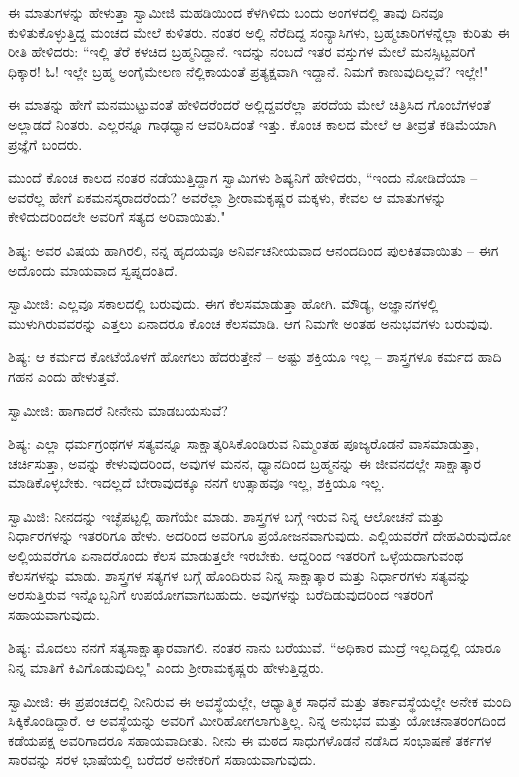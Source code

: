 ಈ ಮಾತುಗಳನ್ನು ಹೇಳುತ್ತಾ ಸ್ವಾಮೀಜಿ ಮಹಡಿಯಿಂದ ಕೆಳಗಿಳಿದು ಬಂದು ಅಂಗಳದಲ್ಲಿ ತಾವು ದಿನವೂ ಕುಳಿತುಕೊಳ್ಳುತ್ತಿದ್ದ ಮಂಚದ ಮೇಲೆ ಕುಳಿತರು. ನಂತರ ಅಲ್ಲಿ ನೆರೆದಿದ್ದ ಸಂನ್ಯಾಸಿಗಳು, ಬ್ರಹ್ಮಚಾರಿಗಳನ್ನೆಲ್ಲಾ ಕುರಿತು ಈ ರೀತಿ ಹೇಳಿದರು: “ಇಲ್ಲಿ ತೆರೆ ಕಳಚಿದ ಬ್ರಹ್ಮನಿದ್ದಾನೆ. ಇದನ್ನು ನಂಬದೆ ಇತರ ವಸ್ತುಗಳ ಮೇಲೆ ಮನಸ್ಸಿಟ್ಟವರಿಗೆ ಧಿಕ್ಕಾರ! ಓ! ಇಲ್ಲೇ ಬ್ರಹ್ಮ ಅಂಗೈಮೇಲಣ ನೆಲ್ಲಿಕಾಯಂತೆ ಪ್ರತ್ಯಕ್ಷವಾಗಿ ಇದ್ದಾನೆ. ನಿಮಗೆ ಕಾಣುವುದಿಲ್ಲವೆ? ಇಲ್ಲೇ!"

ಈ ಮಾತನ್ನು ಹೇಗೆ ಮನಮುಟ್ಟುವಂತೆ ಹೇಳಿದರೆಂದರೆ ಅಲ್ಲಿದ್ದವರೆಲ್ಲಾ ಪರದೆಯ ಮೇಲೆ ಚಿತ್ರಿಸಿದ ಗೊಂಬೆಗಳಂತೆ ಅಲ್ಲಾಡದೆ ನಿಂತರು. ಎಲ್ಲರನ್ನೂ ಗಾಢಧ್ಯಾನ ಆವರಿಸಿದಂತೆ ಇತ್ತು. ಕೊಂಚ ಕಾಲದ ಮೇಲೆ ಆ ತೀವ್ರತೆ ಕಡಿಮೆಯಾಗಿ ಪ್ರಜ್ಞೆಗೆ ಬಂದರು.

ಮುಂದೆ ಕೊಂಚ ಕಾಲದ ನಂತರ ನಡೆಯುತ್ತಿದ್ದಾಗ ಸ್ವಾಮಿಗಳು ಶಿಷ್ಯನಿಗೆ ಹೇಳಿದರು, “ಇಂದು ನೋಡಿದೆಯಾ – ಅವರೆಲ್ಲ ಹೇಗೆ ಏಕಮನಸ್ಕರಾದರೆಂದು? ಅವರೆಲ್ಲಾ ಶ‍್ರೀರಾಮಕೃಷ್ಣರ ಮಕ್ಕಳು, ಕೇವಲ ಆ ಮಾತುಗಳನ್ನು ಕೇಳಿದುದರಿಂದಲೇ ಅವರಿಗೆ ಸತ್ಯದ ಅರಿವಾಯಿತು."

ಶಿಷ್ಯ: ಅವರ ವಿಷಯ ಹಾಗಿರಲಿ, ನನ್ನ ಹೃದಯವೂ ಅನಿರ್ವಚನೀಯವಾದ ಆನಂದದಿಂದ ಪುಲಕಿತವಾಯಿತು – ಈಗ ಅದೊಂದು ಮಾಯವಾದ ಸ್ವಪ್ನದಂತಿದೆ.

ಸ್ವಾಮೀಜಿ: ಎಲ್ಲವೂ ಸಕಾಲದಲ್ಲಿ ಬರುವುದು. ಈಗ ಕೆಲಸಮಾಡುತ್ತಾ ಹೋಗಿ. ಮೌಡ್ಯ, ಅಜ್ಞಾನಗಳಲ್ಲಿ ಮುಳುಗಿರುವವರನ್ನು ಎತ್ತಲು ಏನಾದರೂ ಕೊಂಚ ಕೆಲಸಮಾಡಿ. ಆಗ ನಿಮಗೇ ಅಂತಹ ಅನುಭವಗಳು ಬರುವುವು.

ಶಿಷ್ಯ: ಆ ಕರ್ಮದ ಕೋಟೆಯೊಳಗೆ ಹೋಗಲು ಹೆದರುತ್ತೇನೆ – ಅಷ್ಟು ಶಕ್ತಿಯೂ ಇಲ್ಲ – ಶಾಸ್ತ್ರಗಳೂ ಕರ್ಮದ ಹಾದಿ ಗಹನ ಎಂದು ಹೇಳುತ್ತವೆ.

ಸ್ವಾಮೀಜಿ: ಹಾಗಾದರೆ ನೀನೇನು ಮಾಡಬಯಸುವೆ?

ಶಿಷ್ಯ: ಎಲ್ಲಾ ಧರ್ಮಗ್ರಂಥಗಳ ಸತ್ಯವನ್ನೂ ಸಾಕ್ಷಾತ್ಕರಿಸಿಕೊಂಡಿರುವ ನಿಮ್ಮಂತಹ ಪೂಜ್ಯರೊಡನೆ ವಾಸಮಾಡುತ್ತಾ, ಚರ್ಚಿಸುತ್ತಾ, ಅವನ್ನು ಕೇಳುವುದರಿಂದ, ಅವುಗಳ ಮನನ, ಧ್ಯಾನದಿಂದ ಬ್ರಹ್ಮನನ್ನು ಈ ಜೀವನದಲ್ಲೇ ಸಾಕ್ಷಾತ್ಕಾರ ಮಾಡಿಕೊಳ್ಳಬೇಕು. ಇದಲ್ಲದೆ ಬೇರಾವುದಕ್ಕೂ ನನಗೆ ಉತ್ಸಾಹವೂ ಇಲ್ಲ, ಶಕ್ತಿಯೂ ಇಲ್ಲ.

ಸ್ವಾಮಿಜಿ: ನೀನದನ್ನು ಇಚ್ಛೆಪಟ್ಟಲ್ಲಿ ಹಾಗೆಯೇ ಮಾಡು. ಶಾಸ್ತ್ರಗಳ ಬಗ್ಗೆ ಇರುವ ನಿನ್ನ ಆಲೋಚನೆ ಮತ್ತು ನಿರ್ಧಾರಗಳನ್ನು ಇತರರಿಗೂ ಹೇಳು. ಅದರಿಂದ ಅವರಿಗೂ ಪ್ರಯೋಜನವಾಗುವುದು. ಎಲ್ಲಿಯವರೆಗೆ ದೇಹವಿರುವುದೋ ಅಲ್ಲಿಯವರೆಗೂ ಏನಾದರೊಂದು ಕೆಲಸ ಮಾಡುತ್ತಲೇ ಇರಬೇಕು. ಆದ್ದರಿಂದ ಇತರರಿಗೆ ಒಳ್ಳೆಯದಾಗುವಂಥ ಕೆಲಸಗಳನ್ನು ಮಾಡು. ಶಾಸ್ತ್ರಗಳ ಸತ್ಯಗಳ ಬಗ್ಗೆ ಹೊಂದಿರುವ ನಿನ್ನ ಸಾಕ್ಷಾತ್ಕಾರ ಮತ್ತು ನಿರ್ಧಾರಗಳು ಸತ್ಯವನ್ನು ಅರಸುತ್ತಿರುವ ಇನ್ನೊಬ್ಬನಿಗೆ ಉಪಯೋಗವಾಗಬಹುದು. ಅವುಗಳನ್ನು ಬರೆದಿಡುವುದರಿಂದ ಇತರರಿಗೆ ಸಹಾಯವಾಗುವುದು.

ಶಿಷ್ಯ: ಮೊದಲು ನನಗೆ ಸತ್ಯಸಾಕ್ಷಾತ್ಕಾರವಾಗಲಿ. ನಂತರ ನಾನು ಬರೆಯುವೆ. “ಅಧಿಕಾರ ಮುದ್ರೆ ಇಲ್ಲದಿದ್ದಲ್ಲಿ ಯಾರೂ ನಿನ್ನ ಮಾತಿಗೆ ಕಿವಿಗೊಡುವುದಿಲ್ಲ" ಎಂದು ಶ‍್ರೀರಾಮಕೃಷ್ಣರು ಹೇಳುತ್ತಿದ್ದರು.

ಸ್ವಾಮೀಜಿ: ಈ ಪ್ರಪಂಚದಲ್ಲಿ ನೀನಿರುವ ಈ ಅವಸ್ಥೆಯಲ್ಲೇ, ಆಧ್ಯಾತ್ಮಿಕ ಸಾಧನೆ ಮತ್ತು ತರ್ಕಾವಸ್ಥೆಯಲ್ಲೇ ಅನೇಕ ಮಂದಿ ಸಿಕ್ಕಿಕೊಂಡಿದ್ದಾರೆ. ಆ ಅವಸ್ಥೆಯನ್ನು ಅವರಿಗೆ ಮೀರಿಹೋಗಲಾಗುತ್ತಿಲ್ಲ. ನಿನ್ನ ಅನುಭವ ಮತ್ತು ಯೋಚನಾತರಂಗದಿಂದ ಕಡೆಯಪಕ್ಷ ಅವರಿಗಾದರೂ ಸಹಾಯವಾದೀತು. ನೀನು ಈ ಮಠದ ಸಾಧುಗಳೊಡನೆ ನಡೆಸಿದ ಸಂಭಾಷಣೆ ತರ್ಕಗಳ ಸಾರವನ್ನು ಸರಳ ಭಾಷೆಯಲ್ಲಿ ಬರೆದರೆ ಅನೇಕರಿಗೆ ಸಹಾಯವಾಗುವುದು.

